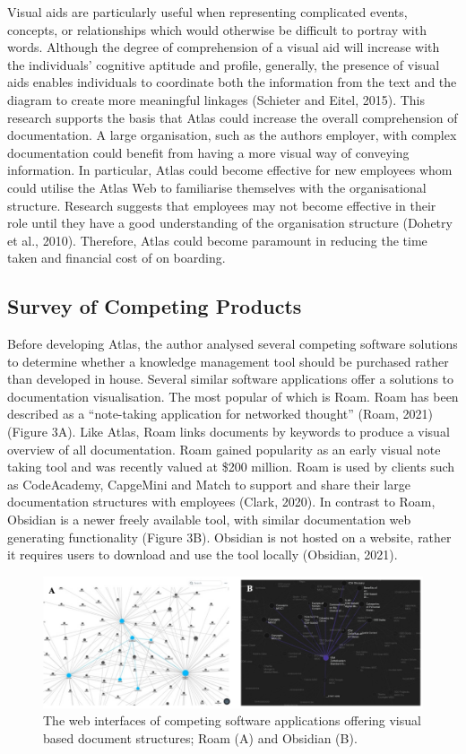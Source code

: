 \documentclass{article}
\begin{document}
Visual aids are particularly useful when representing complicated events, concepts, or relationships which would otherwise be difficult to portray with words. Although the degree of comprehension of a visual aid will increase with the individuals' cognitive aptitude and profile, generally, the presence of visual aids enables individuals to coordinate both the information from the text and the diagram to create more meaningful linkages (Schieter and Eitel, 2015). This research supports the basis that Atlas could increase the overall comprehension of documentation. A large organisation, such as the authors employer, with complex documentation could benefit from having a more visual way of conveying information. In particular, Atlas could become effective for new employees whom could utilise the Atlas Web to familiarise themselves with the organisational structure. Research suggests that employees may not become effective in their role until they have a good understanding of the organisation structure (Dohetry et al., 2010). Therefore, Atlas could become paramount in reducing the time taken and financial cost of on boarding. 

\subsection{Survey of Competing Products}

Before developing Atlas, the author analysed several competing software solutions to determine whether a knowledge management tool should be purchased rather than developed in house. Several similar software applications offer a solutions to documentation visualisation. The most popular of which is Roam. Roam has been described as a “note-taking application for networked thought” (Roam, 2021) (Figure 3A). Like Atlas, Roam links documents by keywords to produce a visual overview of all documentation. Roam gained popularity as an early visual note taking tool and was recently valued at \$200 million. Roam is used by clients such as CodeAcademy, CapgeMini and Match to support and share their large documentation structures with employees (Clark, 2020). In contrast to Roam, Obsidian is a newer freely available tool, with similar documentation web generating functionality (Figure 3B). Obsidian is not hosted on a website, rather it requires users to download and use the tool locally (Obsidian, 2021).

\begin{figure}[!htb]
  \centering
      \includegraphics[width=1\textwidth]{images/roam-and-obsidian.png}
  \caption{The web interfaces of competing software applications offering visual based document structures; Roam (A) and Obsidian (B).}
\end{figure}
\end{document}
